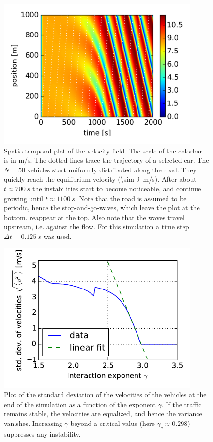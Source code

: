 \begin{figure}
    \centering
    \includegraphics[width=4in]{../img/free_road.png}
    \caption{Spatio-temporal plot of the velocity field. The scale of the colorbar is in m/s. The dotted lines trace the trajectory of a selected car. The $N=50$ vehicles start uniformly distributed along the road. They quickly reach the equilibrium velocity (\SI{\sim 9}{m/s}). After about $t\approx\SI{700}{s}$ the instabilities start to become noticeable, and continue growing until $t\approx \SI{1100}{s}$. Note that the road is assumed to be periodic, hence the stop-and-go-waves, which leave the plot at the bottom, reappear at the top. Also note that the waves travel upstream, i.e. against the flow. For this simulation a time step $\Delta t=\SI{0.125}{s}$ was used.}
    \label{fig:free_road}
\end{figure}

\begin{figure}
    \centering
    \includegraphics[width=4in]{../img/order_parameter.pdf}
    \caption{Plot of the standard deviation of the velocities of the vehicles at the end of the simulation as a function of the exponent $\gamma$. If the traffic remains stable, the velocities are equalized, and hence the variance vanishes. Increasing $\gamma$ beyond a critical value (here $\gamma_c \approx 0.298$) suppresses any instability.}
    \label{fig:order_param}
\end{figure}

